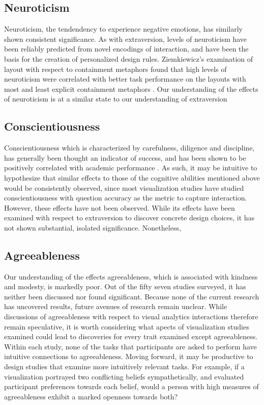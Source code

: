 \documentclass[conference]{IEEEtran}
\begin{document}
\subsection{Neuroticism}\label{Neuroticism}
Neuroticism, the tendendency to experience negative emotions, has similarly shown consistent
significance. As with extraversion, levels of neuroticism have been reliably predicted from
novel encodings of interaction\cite{Waldo}, and have been the basis for the creation of
personalized design rules\cite{SarsamFirstLook}. Ziemkiewicz's examination of layout with
respect to containment metaphors found that high levels of neuroticism were correlated with
better task performance on the layouts with most and least explicit containment metaphors
\cite{Ziemkiewicz}. Our understanding of the effects of neuroticism is at a similar state
to our understanding of extraversion 

\subsection{Conscientiousness}\label{Conscientiousness}
Conscientiousness which is characterized by carefulness, diligence and discipline, has generally
been thought an indicator of success, and has been shown to be positively correlated with
academic performance \cite{ImhofSpaet2013pv}. As such, it may be intuitive to hypothesize
that similar effects to those of the cognitive abilities mentioned above would be consistently
observed, since most visualization studies have studied conscientiousness with question
accuracy as the metric to capture interaction. However, these effects have not been observed.
While its effects have been examined with respect to extraversion \cite{SarsamFirstLook} to
discover concrete design choices, it has not shown substantial, isolated significance.
Nonetheless,  


\subsection{Agreeableness}\label{Agreeableness}
Our understanding of the effects agreeableness, which is associated with kindness and modesty,
is markedly poor. Out of the fifty seven studies surveyed, it has neither been discussed nor
found significant. Because none of the current research has uncovered results, future
avenues of research remain unclear. While discussions of agreeableness with respect to
visual analytics interactions therefore remain speculative, it is worth considering what
apects of visualization studies examined could lead to discoveries for every trait examined
except agreeableness. Within each study, none of the tasks that participants are asked to
perform have intuitive connections to agreeableness. Moving forward, it may be productive to
design studies that examine more intuitively relevant tasks. For example, if a visualization
portrayed two conflicting beliefs sympathetically, and evaluated participant preferences
towards each belief, would a person with high measures of agreeableness exhibit a marked
openness towards both?
\end{document}
